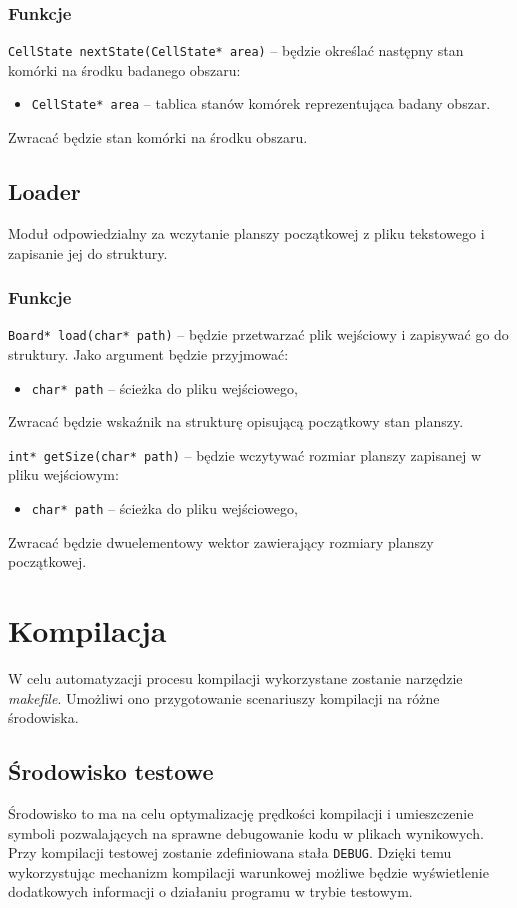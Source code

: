 \documentclass{article}
\begin{document}
\subsubsection{Funkcje}
\noindent{}\texttt{CellState nextState(CellState* area)} -- będzie określać następny stan komórki na środku badanego obszaru:
\begin{itemize}[label={}]
	\item \texttt{CellState* area} -- tablica stanów komórek reprezentująca badany obszar.
\end{itemize}
Zwracać będzie stan komórki na środku obszaru.


\subsection{Loader}
Moduł odpowiedzialny za wczytanie planszy początkowej z pliku tekstowego i zapisanie jej do struktury.

\subsubsection{Funkcje}
\texttt{Board* load(char* path)} -- będzie przetwarzać plik wejściowy i zapisywać go do struktury. Jako argument będzie przyjmować:
\begin{itemize}[label={}]
	\item \texttt{char* path} -- ścieżka do pliku wejściowego,
\end{itemize}
Zwracać będzie wskaźnik na strukturę opisującą początkowy stan planszy.
\vspace{5mm}

\noindent{}\texttt{int* getSize(char* path)} -- będzie wczytywać rozmiar planszy zapisanej w pliku wejściowym:
\begin{itemize}[label={}]
	\item \texttt{char* path} -- ścieżka do pliku wejściowego,
\end{itemize}
Zwracać będzie dwuelementowy wektor zawierający rozmiary planszy początkowej.

\section{Kompilacja}
W celu automatyzacji procesu kompilacji wykorzystane zostanie narzędzie \textit{makefile}. Umożliwi ono przygotowanie scenariuszy kompilacji na różne środowiska.

\subsection{Środowisko testowe}
Środowisko to ma na celu optymalizację prędkości kompilacji i umieszczenie symboli pozwalających na sprawne debugowanie kodu w plikach wynikowych. Przy kompilacji testowej zostanie zdefiniowana stała \texttt{DEBUG}. Dzięki temu wykorzystując mechanizm kompilacji warunkowej możliwe będzie wyświetlenie dodatkowych informacji o działaniu programu w trybie testowym.
\end{document}
